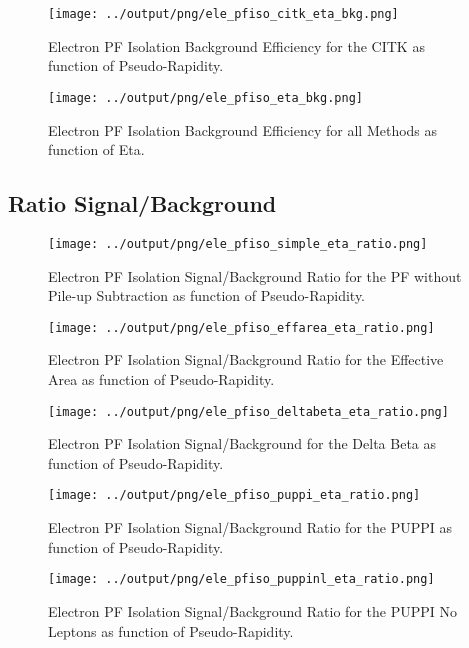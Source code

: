 \documentclass[11pt]{book}
\begin{document}
\begin{figure}[htb]
\centering
\texttt{[image: ../output/png/ele\_pfiso\_citk\_eta\_bkg.png]}
\caption{Electron PF Isolation Background Efficiency for the CITK as function of Pseudo-Rapidity.}
\label{fig:ele_pfiso_eta_bkg_citk}
\end{figure}

\begin{figure}[htb]
\centering
\texttt{[image: ../output/png/ele\_pfiso\_eta\_bkg.png]}
\caption{Electron PF Isolation Background Efficiency for all Methods as function of Eta.}
\label{fig:ele_pfiso_eta_bkg}
\end{figure}
\clearpage

\subsection{Ratio Signal/Background}
\begin{figure}[htb]
\centering
\texttt{[image: ../output/png/ele\_pfiso\_simple\_eta\_ratio.png]}
\caption{Electron PF Isolation Signal/Background Ratio for the PF without Pile-up Subtraction as function of Pseudo-Rapidity.}
\label{fig:ele_pfiso_eta_ratio_simple}
\end{figure}


\begin{figure}[htb]
\centering
\texttt{[image: ../output/png/ele\_pfiso\_effarea\_eta\_ratio.png]}
\caption{Electron PF Isolation Signal/Background Ratio for the Effective Area as function of Pseudo-Rapidity.}
\label{fig:ele_pfiso_eta_ratio_effarea}
\end{figure}

\begin{figure}[htb]
\centering
\texttt{[image: ../output/png/ele\_pfiso\_deltabeta\_eta\_ratio.png]}
\caption{Electron PF Isolation Signal/Background for the Delta Beta as function of Pseudo-Rapidity.}
\label{fig:ele_pfiso_eta_ratio_deltabeta}
\end{figure}

\begin{figure}[htb]
\centering
\texttt{[image: ../output/png/ele\_pfiso\_puppi\_eta\_ratio.png]}
\caption{Electron PF Isolation Signal/Background Ratio for the PUPPI as function of Pseudo-Rapidity.}
\label{fig:ele_pfiso_eta_ratio_puppi}
\end{figure}


\begin{figure}[htb]
\centering
\texttt{[image: ../output/png/ele\_pfiso\_puppinl\_eta\_ratio.png]}
\caption{Electron PF Isolation Signal/Background Ratio for the PUPPI No Leptons as function of Pseudo-Rapidity.}
\label{fig:ele_pfiso_eta_ratio_puppinl}
\end{figure}
\end{document}
